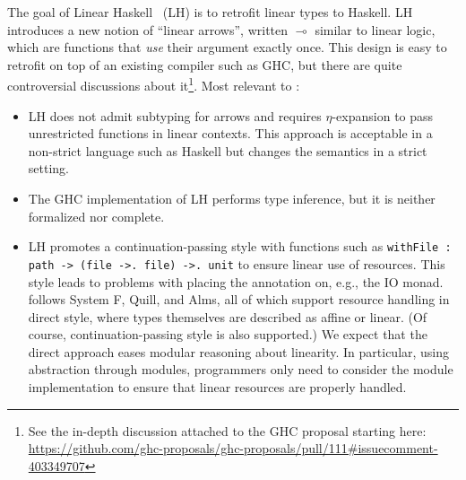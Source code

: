 The goal of Linear Haskell~\citep{DBLP:journals/pacmpl/BernardyBNJS18}
(LH) is to retrofit linear types to Haskell.
LH introduces a new notion
of ``linear arrows'', written $\multimap$ similar to linear logic,
which are functions that \emph{use} their argument exactly once.
This design is easy to retrofit on top of an existing compiler
such as GHC, but there are quite controversial discussions about it\footnote{
  See the in-depth discussion attached to the GHC proposal starting here: \url{https://github.com/ghc-proposals/ghc-proposals/pull/111\#issuecomment-403349707}}.
Most relevant to \lang:
\begin{itemize}[leftmargin=*]
\item LH does not admit subtyping for arrows and requires
  $\eta$-expansion to pass unrestricted functions in linear
  contexts. This approach is acceptable in a non-strict language such as
  Haskell but changes the semantics in a strict setting.
\item
  The GHC implementation of LH performs type inference, but
  it is neither formalized nor complete.
\item
  LH promotes a continuation-passing style with functions such as
  \lstinline/withFile : path -> (file ->. file) ->. unit/
  to ensure linear use of resources. This style leads to problems with
  placing the annotation on, e.g., the IO monad.
  \lang follows System F\degree, Quill, and Alms, all of which support
  resource handling in direct style, where types themselves are
  described as affine or linear. (Of course, continuation-passing
  style is also supported.)
  We expect that the direct approach eases modular reasoning about linearity.
  In particular, using abstraction through modules,
  programmers only need to consider the module
  implementation to ensure that linear
  resources are properly handled.
\end{itemize}

